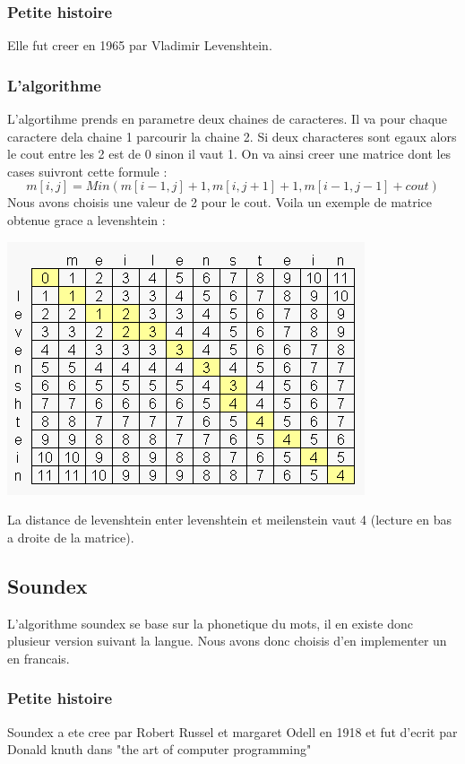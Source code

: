 \subsubsection{Petite histoire}
Elle fut creer en 1965 par Vladimir Levenshtein.
\subsubsection{L'algorithme}
L'algortihme prends en parametre deux chaines de caracteres. Il va pour chaque caractere dela chaine 1 parcourir la chaine 2. Si deux characteres sont egaux alors le cout entre les 2 est de 0 sinon il vaut 1. On va ainsi creer une matrice dont les cases suivront cette formule : 
\[m[i,j] = Min ( m[i-1,j] + 1, m[i,j+1] + 1, m[i-1,j-1] + cout)\]
Nous avons choisis une valeur de 2 pour le cout.
Voila un exemple de matrice obtenue grace a levenshtein :
\begin{center}
		\includegraphics{Levenshtein-Distance_2.png}
\end{center}
La distance de levenshtein enter levenshtein et meilenstein vaut 4 (lecture en bas a droite de la matrice).

\subsection{Soundex}
L'algorithme soundex se base sur la phonetique du mots, il en existe donc plusieur version suivant la langue. Nous avons donc choisis d'en implementer un en francais.
\subsubsection{Petite histoire}
Soundex a ete cree par Robert Russel et margaret Odell en 1918 et fut d'ecrit par Donald knuth dans "the art of computer programming"

